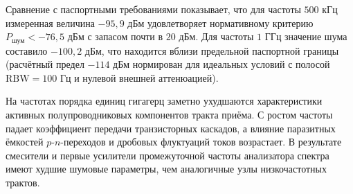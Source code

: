 Сравнение с паспортными требованиями показывает, что для частоты $500\text{ кГц}$ измеренная величина $-95{,}9\text{ дБм}$ удовлетворяет нормативному критерию $P_{\text{шум}} < -76{,}5\text{ дБм}$ с запасом почти в $20\text{ дБм}$. Для частоты $1\text{ ГГц}$ значение шума составило $-100{,}2\text{ дБм}$, что находится вблизи предельной паспортной границы (расчётный предел $-114\text{ дБм}$ нормирован для идеальных условий с полосой $\text{RBW} = 100\text{ Гц}$ и нулевой внешней аттенюацией).

На частотах порядка единиц гигагерц заметно ухудшаются характеристики активных полупроводниковых компонентов тракта приёма. С ростом частоты падает коэффициент передачи транзисторных каскадов, а влияние паразитных ёмкостей $p$-$n$-переходов и дробовых флуктуаций токов возрастает. В результате смесители и первые усилители промежуточной частоты анализатора спектра имеют худшие шумовые параметры, чем аналогичные узлы низкочастотных трактов.

